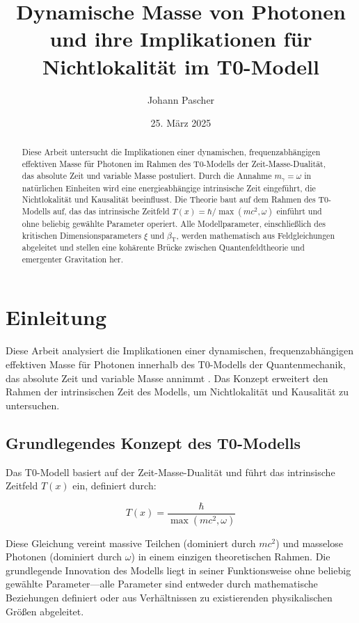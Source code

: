 \documentclass[12pt,a4paper]{article}
\title{Dynamische Masse von Photonen und ihre Implikationen für Nichtlokalität im T0-Modell}
\author{Johann Pascher}
\date{25. März 2025}
\newcommand{\Tfield}{T(x)}
\newcommand{\betaT}{\beta_{\text{T}}}
\begin{document}
	
	\maketitle
	
	\begin{abstract}
		Diese Arbeit untersucht die Implikationen einer dynamischen, frequenzabhängigen effektiven Masse für Photonen im Rahmen des T0-Modells der Zeit-Masse-Dualität, das absolute Zeit und variable Masse postuliert. Durch die Annahme \(m_\gamma = \omega\) in natürlichen Einheiten wird eine energieabhängige intrinsische Zeit eingeführt, die Nichtlokalität und Kausalität beeinflusst. Die Theorie baut auf dem Rahmen des T0-Modells auf, das das intrinsische Zeitfeld \(\Tfield = \hbar/\max(mc^2, \omega)\) einführt und ohne beliebig gewählte Parameter operiert. Alle Modellparameter, einschließlich des kritischen Dimensionsparameters \(\xi\) und \(\betaT\), werden mathematisch aus Feldgleichungen abgeleitet und stellen eine kohärente Brücke zwischen Quantenfeldtheorie und emergenter Gravitation her.
	\end{abstract}
	
	\tableofcontents
	\newpage
	
	\section{Einleitung}
	
	Diese Arbeit analysiert die Implikationen einer dynamischen, frequenzabhängigen effektiven Masse für Photonen innerhalb des T0-Modells der Quantenmechanik, das absolute Zeit und variable Masse annimmt \cite{pascher_galaxies_2025}. Das Konzept erweitert den Rahmen der intrinsischen Zeit des Modells, um Nichtlokalität und Kausalität zu untersuchen.
	
	\subsection{Grundlegendes Konzept des T0-Modells}
	
	Das T0-Modell basiert auf der Zeit-Masse-Dualität und führt das intrinsische Zeitfeld \(\Tfield\) ein, definiert durch:
	
	\begin{equation}
		\Tfield = \frac{\hbar}{\max(mc^2, \omega)}
	\end{equation}
	
	Diese Gleichung vereint massive Teilchen (dominiert durch \(mc^2\)) und masselose Photonen (dominiert durch \(\omega\)) in einem einzigen theoretischen Rahmen. Die grundlegende Innovation des Modells liegt in seiner Funktionsweise ohne beliebig gewählte Parameter—alle Parameter sind entweder durch mathematische Beziehungen definiert oder aus Verhältnissen zu existierenden physikalischen Größen abgeleitet.
	
\end{document}
